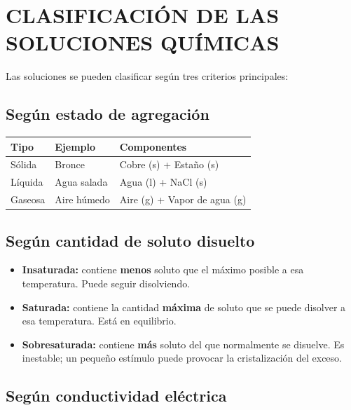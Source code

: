 \documentclass[11pt,a4paper]{article}
\begin{document}
\newpage
\section{CLASIFICACIÓN DE LAS SOLUCIONES QUÍMICAS}

Las soluciones se pueden clasificar según tres criterios principales:

\subsection{Según estado de agregación}

\begin{center}
\begin{tabular}{|l|l|l|}
  \hline
  \textbf{Tipo} & \textbf{Ejemplo} & \textbf{Componentes} \\
  \hline
  Sólida & Bronce & Cobre (s) + Estaño (s) \\
  \hline
  Líquida & Agua salada & Agua (l) + NaCl (s) \\
  \hline
  Gaseosa & Aire húmedo & Aire (g) + Vapor de agua (g) \\
  \hline
\end{tabular}
\end{center}

\subsection{Según cantidad de soluto disuelto}

\begin{tcolorbox}[propiedad, title=Clasificación por cantidad de soluto]
\begin{itemize}[nosep]
  \item \textbf{Insaturada:} contiene \textbf{menos} soluto que el máximo posible a esa temperatura. Puede seguir disolviendo.
  \item \textbf{Saturada:} contiene la cantidad \textbf{máxima} de soluto que se puede disolver a esa temperatura. Está en equilibrio.
  \item \textbf{Sobresaturada:} contiene \textbf{más} soluto del que normalmente se disuelve. Es inestable; un pequeño estímulo puede provocar la cristalización del exceso.
\end{itemize}
\end{tcolorbox}

\subsection{Según conductividad eléctrica}
\end{document}
